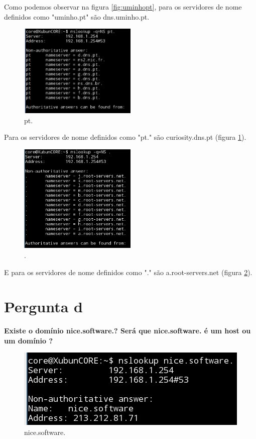 \documentclass[a4paper]{report}
\begin{document}
Como podemos observar na figura \ref{fig:uminhopt}, para os servidores de nome 
definidos como "uminho.pt" são dns.uminho.pt.

\begin{figure}[H]
    \centering 
    \includegraphics[width=0.5\textwidth]{images/ptponto.png}  
    \caption{pt.}
    \label{fig:ptponto}
\end{figure}

Para os servidores de nome definidos como "pt." são curiosity.dns.pt
(figura \ref{fig:ptponto}).

\begin{figure}[H]
    \centering 
    \includegraphics[width=0.5\textwidth]{images/ponto.png}  
    \caption{.}
    \label{fig:ponto}
\end{figure}

E para os servidores de nome definidos como "." são a.root-servers.net
(figura \ref{fig:ponto}).

\section{Pergunta d}
\textbf{Existe o domínio nice.software.? Será que nice.software. é um host ou um
domínio ?}

\begin{figure}[H]
    \centering 
    \includegraphics[width=\textwidth]{images/nicesoftware.png}  
    \caption{nice.software.}
    \label{fig:nicesoftware}
\end{figure}
\end{document}
